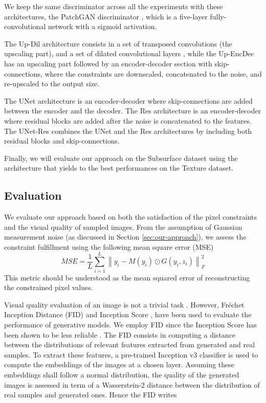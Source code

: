 We keep the same discriminator across all the experiments with these architectures, the PatchGAN discriminator \cite{Isola2017}, which is a five-layer fully-convolutional network with a sigmoid activation.

The Up-Dil architecture consists in a set of transposed convolutions (the upscaling part), and a set of dilated convolutional layers \cite{yu2015multi}, while the Up-EncDec has an upscaling part followed by an encoder-decoder section with skip-connections, where the constraints are downscaled, concatenated to the noise, and re-upscaled to the output size.

The UNet \cite{ronneberger2015u} architecture is an encoder-decoder where skip-connections are added between the encoder and the decoder.
The Res architecture is an encoder-decoder where residual blocks \cite{he2016deep} are added after the noise is concatenated to the features. The UNet-Res combines the UNet and the Res architectures by including both residual blocks and skip-connections.

Finally, we will evaluate our approach on the Subsurface dataset using the architecture that yields to the best performances on the Texture dataset.
%
\subsection{Evaluation}
\label{subs:eval}
We evaluate our approach based on both the satisfaction of the pixel constraints and the visual quality of sampled images. From the assumption of Gaussian measurement noise (as discussed in Section \ref{sec:our-approach}), we assess the constraint fulfillment using the following mean square error (MSE) 
\begin{equation}
MSE = \frac{1}{L} \sum_{i=1}^L \left\|y_i - M(y_i) \odot G(y_i, z_i)\right\|_F^2
\end{equation}
This metric should be understood as the mean squared error of reconstructing the constrained pixel values. 

Visual quality evaluation of an image is not a trivial task \cite{Theis2015}. However, Fréchet Inception Distance (FID) \cite{Heusel2017} and Inception Score \cite{Salimans2016}, have been used to evaluate the performance of generative models. We employ FID since the Inception Score has been shown to be less reliable \cite{Barratt}. The FID consists in computing a distance between the distributions of relevant features extracted from generated and real samples. To extract these features, a pre-trained Inception v3 \cite{Szegedy2016} classifier is used to compute the embeddings of the images  at a chosen layer. Assuming these embeddings shall follow a normal distribution, the quality of the generated images is assessed in term of a Wasserstein-2 distance between the distribution of real samples and generated ones. Hence the FID writes
%

